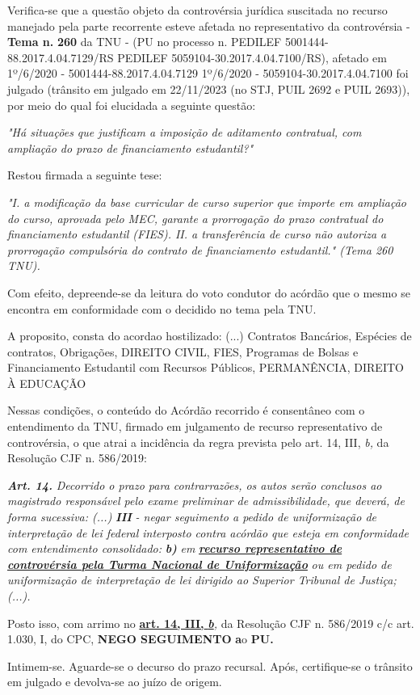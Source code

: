 \documentclass[12pt]{article}
\begin{document}
\justifying
\noindent Verifica-se que a questão objeto da controvérsia jurídica suscitada no recurso manejado pela parte recorrente esteve afetada no representativo da controvérsia - \textbf{Tema n. }\textbf{260} da TNU - (PU no processo n. PEDILEF 5001444-88.2017.4.04.7129/RS PEDILEF 5059104-30.2017.4.04.7100/RS),  afetado em 1º/6/2020 - 5001444-88.2017.4.04.7129 1º/6/2020 - 5059104-30.2017.4.04.7100 foi julgado (trânsito em julgado em 22/11/2023 (no STJ, PUIL 2692 e PUIL 2693)), por meio do qual foi elucidada a seguinte questão:

\noindent \textit{"Há situações que justificam a imposição de aditamento contratual, com ampliação do prazo de financiamento estudantil?"}

\noindent Restou firmada a seguinte tese:

\noindent \textit{"I. a modificação da base curricular de curso superior que importe em ampliação do curso, aprovada pelo MEC, garante a prorrogação do prazo contratual do financiamento estudantil (FIES). II. a transferência de curso não autoriza a prorrogação compulsória do contrato de financiamento estudantil." (Tema 260 TNU).}

\noindent Com efeito, depreende-se da leitura do voto condutor do acórdão que o mesmo se encontra em conformidade com o decidido no  tema pela TNU.

\noindent A proposito, consta do acordao hostilizado: (...) Contratos Bancários, Espécies de contratos, Obrigações, DIREITO CIVIL, FIES, Programas de Bolsas e Financiamento Estudantil com Recursos Públicos, PERMANÊNCIA, DIREITO À EDUCAÇÃO

\noindent Nessas condições, o conteúdo do Acórdão recorrido é consentâneo com o entendimento da TNU, firmado em julgamento de recurso representativo de controvérsia, o que atrai a incidência da regra prevista pelo art. 14, III, \textit{b,} da Resolução CJF n. 586/2019:

\noindent \textit{\textbf{Art. 14.}}\textit{ Decorrido o prazo para contrarrazões, os autos serão conclusos ao magistrado responsável pelo exame preliminar de admissibilidade, que deverá, de forma sucessiva: (...) }\textit{\textbf{III }}\textit{- negar seguimento a pedido de uniformização de interpretação de lei federal interposto contra acórdão que esteja em conformidade com entendimento consolidado: }\textit{\textbf{b)}}\textit{ em }\uline{\textit{\textbf{recurso representativo de controvérsia pela Turma Nacional de Uniformização}}}\textit{ ou em pedido de uniformização de interpretação de lei dirigido ao Superior Tribunal de Justiça;(...).}

\noindent Posto isso, com arrimo no \uline{\textbf{art. 14, III, }}\uline{\textit{\textbf{b}}}\textit{,} da Resolução CJF n. 586/2019 c/c art. 1.030, I, do CPC, \textbf{NEGO SEGUIMENTO }\textbf{a}o\textbf{ PU}\textbf{.}

\noindent Intimem-se. Aguarde-se o decurso do prazo recursal. Após, certifique-se o trânsito em julgado e devolva-se ao juízo de origem.
\end{document}
